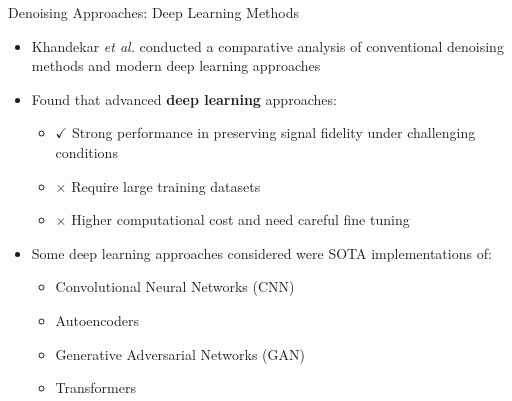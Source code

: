 \documentclass{beamer}
\begin{document}
\begin{frame}{Denoising Approaches: Deep Learning Methods}
    \begin{itemize}
        \item Khandekar \textit{et al.} conducted a comparative analysis of conventional denoising methods and modern deep learning approaches~\cite{Khandekar2025ECGDF}
        \item Found that advanced \textbf{deep learning} approaches:
        \begin{itemize}
            \item $\checkmark$ Strong performance in preserving signal fidelity under challenging conditions
            \item $\times$ Require large training datasets
            \item $\times$ Higher computational cost and need careful fine tuning
        \end{itemize}
        \item Some deep learning approaches considered were SOTA implementations of:
        \begin{itemize}
            \item Convolutional Neural Networks (CNN) \cite{residualcnn}
            \item Autoencoders  \cite{Zhang2025VMDRLS}
            \item Generative Adversarial Networks (GAN) \cite{Zhang2025VMDRLS}
            \item Transformers \cite{Mvuh2024MultichannelECGDenoising}
        \end{itemize}
    \end{itemize}
\end{frame}
\end{document}
